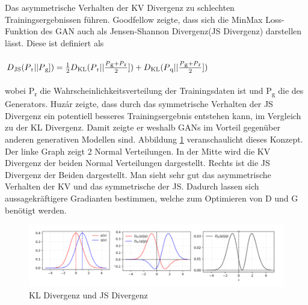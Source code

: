 \documentclass{llncs}
\begin{document}
Das asymmetrische Verhalten der KV Divergenz zu schlechten Trainingsergebnissen führen. Goodfellow \cite{goodfellow2014} zeigte, dass sich die MinMax Loss-Funktion des GAN auch als Jensen-Shannon Divergenz(JS Divergenz) darstellen lässt. Diese ist definiert als
\\\\
\begin{math} D\textsubscript{JS}(P\textsubscript{r}|| P\textsubscript{g}])=\frac{1}{2}D\textsubscript{KL}(P\textsubscript{r}|| \frac{P\textsubscript{g}+P\textsubscript{r}}{2}])+D\textsubscript{KL}(P\textsubscript{q}|| \frac{P\textsubscript{g}+P\textsubscript{r}}{2}])  
\end{math}
\\\\
wobei P\textsubscript{r} die Wahrscheinlichkeitsverteilung der Trainingsdaten ist und P\textsubscript{g} die des Generators. Huzár \cite{sha} zeigte, dass durch das symmetrische Verhalten der JS Divergenz ein potentiell besseres Trainingsergebnis entstehen kann, im Vergleich zu der KL Divergenz. Damit zeigte er weshalb GANs im Vorteil gegenüber anderen generativen Modellen sind. Abbildung \ref{fig:Bild21} veranschaulicht dieses Konzept. Der linke Graph zeigt 2 Normal Verteilungen. In der Mitte wird die KV Divergenz der beiden Normal Verteilungen dargestellt.  Rechts ist die JS Divergenz der Beiden dargestellt. Man sieht sehr gut das asymmetrische Verhalten der KV und das symmetrische der JS. Dadurch lassen sich aussagekräftigere Gradianten bestimmen, welche zum Optimieren von D und G benötigt werden\cite{sha}. 
 
\begin{figure}
	\centering
	\includegraphics[width=1.0\linewidth]{KLdiv}
	\caption{KL Divergenz und JS Divergenz \protect\cite{gan_prob}}
	\label{fig:Bild21}
\end{figure}
\end{document}
